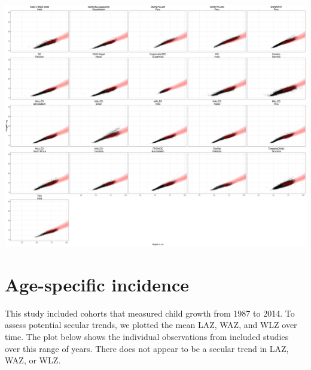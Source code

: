 \documentclass[
  9pt,
]{book}
\begin{document}
\includegraphics[width=104.17in]{figures//shared/wlz_QA_cohort_monthly}

\hypertarget{age-specific-incidence-2}{%
\section{Age-specific incidence}\label{age-specific-incidence-2}}

This study included cohorts that measured child growth from 1987 to 2014. To assess potential secular trends, we plotted the mean LAZ, WAZ, and WLZ over time. The plot below shows the individual observations from included studies over this range of years. There does not appear to be a secular trend in LAZ, WAZ, or WLZ.
\end{document}

